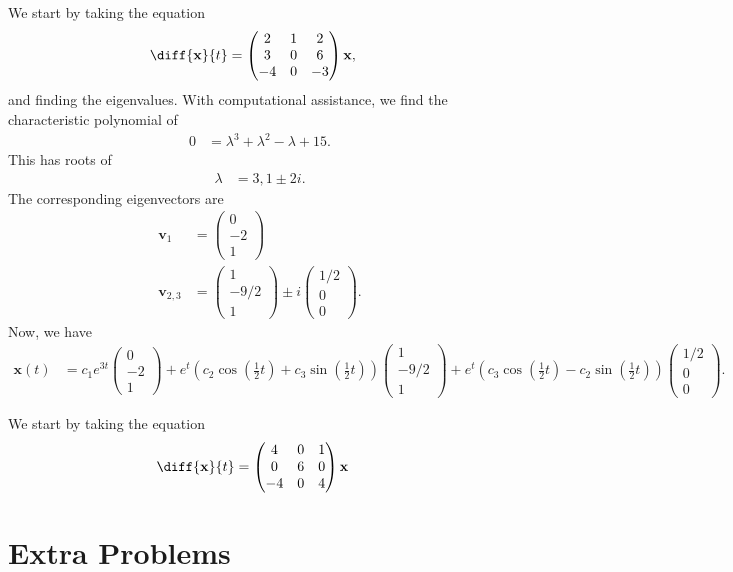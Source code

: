 \documentclass[10pt]{mypackage}
\begin{document}
\begin{solution}[8.2, Problem 40]
  We start by taking the equation
  \begin{align*}
    \diff{\mathbf{x}}{t} &= \begin{pmatrix}2 & 1 & 2 \\ 3 & 0 & 6 \\ -4 & 0 & -3\end{pmatrix} \mathbf{x},
  \end{align*}
  and finding the eigenvalues. With computational assistance, we find the characteristic polynomial of
  \begin{align*}
    0 &= \lambda^3 + \lambda^2 - \lambda + 15.
  \end{align*}
  This has roots of
  \begin{align*}
    \lambda &= 3,1\pm 2i.
  \end{align*}
  The corresponding eigenvectors are
  \begin{align*}
    \mathbf{v}_1 &= \begin{pmatrix}0\\-2\\1\end{pmatrix}\\
    \mathbf{v}_{2,3} &= \begin{pmatrix}1 \\-9/2\\1\end{pmatrix}\pm i \begin{pmatrix}1/2\\0\\0\end{pmatrix}.
  \end{align*}
  Now, we have
  \begin{align*}
    \mathbf{x}(t) &= c_1e^{3t} \begin{pmatrix}0\\-2\\1\end{pmatrix} + e^{t} \left( c_2\cos\left( \frac{1}{2}t \right) + c_3\sin\left( \frac{1}{2}t \right) \right) \begin{pmatrix}1\\-9/2\\1\end{pmatrix} + e^{t}\left( c_3\cos\left( \frac{1}{2}t \right) - c_2\sin\left( \frac{1}{2}t \right) \right) \begin{pmatrix}1/2\\0\\0\end{pmatrix}.
  \end{align*}
\end{solution}
\begin{solution}[8.2, Problem 42]
  We start by taking the equation
  \begin{align*}
    \diff{\mathbf{x}}{t} &= \begin{pmatrix}4 & 0 & 1 \\ 0 & 6 & 0 \\ -4 & 0 & 4\end{pmatrix} \mathbf{x}
  \end{align*}
  
\end{solution}
\begin{solution}[8.2, Problem 46]

\end{solution}
\section{Extra Problems}%
\end{document}

